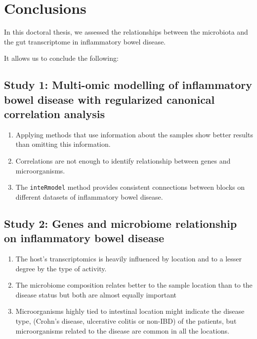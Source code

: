 \documentclass[
  12pt,
  a4paper,
  twoside,
  openright]{book}
\providecommand{\tightlist}{%
  \setlength{\itemsep}{0pt}\setlength{\parskip}{0pt}}
\begin{document}
\hypertarget{conclusions}{%
\chapter{Conclusions}\label{conclusions}}

In this doctoral thesis, we assessed the relationships between the microbiota and the gut transcriptome in inflammatory bowel disease.

It allows us to conclude the following:

\hypertarget{study-1-multi-omic-modelling-of-inflammatory-bowel-disease-with-regularized-canonical-correlation-analysis}{%
\section{Study 1: Multi-omic modelling of inflammatory bowel disease with regularized canonical correlation analysis}\label{study-1-multi-omic-modelling-of-inflammatory-bowel-disease-with-regularized-canonical-correlation-analysis}}

\begin{enumerate}
\def\labelenumi{\arabic{enumi}.}
\tightlist
\item
  Applying methods that use information about the samples show better results than omitting this information.
\item
  Correlations are not enough to identify relationship between genes and microorganisms.
\item
  The \texttt{inteRmodel} method provides consistent connections between blocks on different datasets of inflammatory bowel disease.
\end{enumerate}

\hypertarget{study-2-genes-and-microbiome-relationship-on-inflammatory-bowel-disease}{%
\section{Study 2: Genes and microbiome relationship on inflammatory bowel disease}\label{study-2-genes-and-microbiome-relationship-on-inflammatory-bowel-disease}}

\begin{enumerate}
\def\labelenumi{\arabic{enumi}.}
\tightlist
\item
  The host's transcriptomics is heavily influenced by location and to a lesser degree by the type of activity.
\item
  The microbiome composition relates better to the sample location than to the disease status but both are almost equally important
\item
  Microorganisms highly tied to intestinal location might indicate the disease type, (Crohn's disease, ulcerative colitis or non-IBD) of the patients, but microorganisms related to the disease are common in all the locations.
\end{enumerate}
\end{document}

